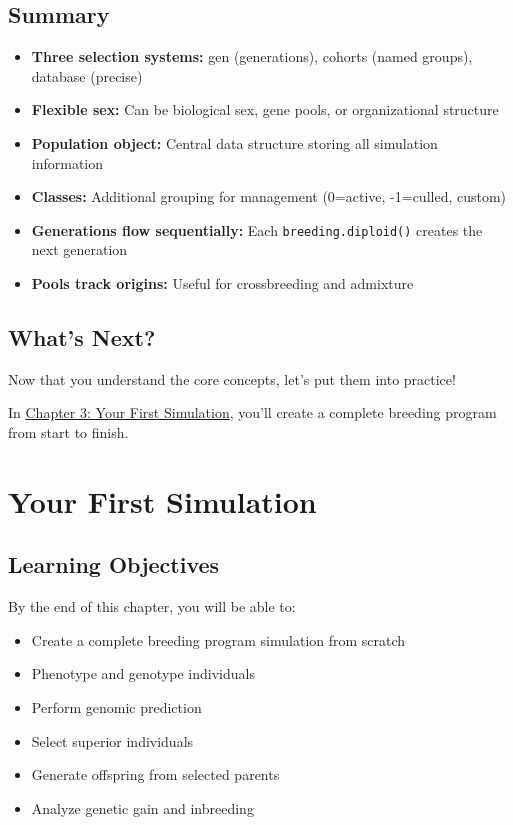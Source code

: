 \documentclass[
  letterpaper,
]{book}
\providecommand{\tightlist}{%
  \setlength{\itemsep}{0pt}\setlength{\parskip}{0pt}}
\begin{document}
\section{Summary}\label{summary-1}

\begin{itemize}
\tightlist
\item
  \textbf{Three selection systems:} gen (generations), cohorts (named
  groups), database (precise)
\item
  \textbf{Flexible sex:} Can be biological sex, gene pools, or
  organizational structure
\item
  \textbf{Population object:} Central data structure storing all
  simulation information
\item
  \textbf{Classes:} Additional grouping for management (0=active,
  -1=culled, custom)
\item
  \textbf{Generations flow sequentially:} Each
  \texttt{breeding.diploid()} creates the next generation
\item
  \textbf{Pools track origins:} Useful for crossbreeding and admixture
\end{itemize}

\section{What's Next?}\label{whats-next-1}

Now that you understand the core concepts, let's put them into practice!

In \href{03-first-simulation.qmd}{Chapter 3: Your First Simulation},
you'll create a complete breeding program from start to finish.

\chapter{Your First Simulation}\label{sec-first-simulation}

\section{Learning Objectives}\label{learning-objectives-2}

By the end of this chapter, you will be able to:

\begin{itemize}
\tightlist
\item
  Create a complete breeding program simulation from scratch
\item
  Phenotype and genotype individuals
\item
  Perform genomic prediction
\item
  Select superior individuals
\item
  Generate offspring from selected parents
\item
  Analyze genetic gain and inbreeding
\end{itemize}
\end{document}
